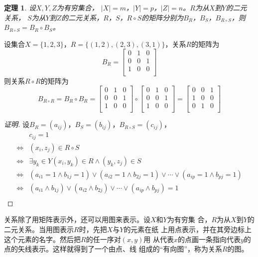 \documentclass{book}[oneside]
\newtheorem{Thm}{定理}[chapter]
\begin{document}
\begin{CJK*}{UTF8}{gbsn}
  \begin{Thm}
    设$X, Y, Z$为有穷集合， $|X| =m$，$|Y|=p$，$|Z| = n$。$R$为从$X$到$Y$的二元
    关系， $S$为从$Y$到$Z$的二元关系，$R$，$S$，$R \circ S$的矩阵分别为$B_{R}$，$B_{S}$，$B_{R\circ S}$，则$B_{R\circ S} = B_R \circ B_S$。
  \end{Thm}
  设集合$X=\{1,2,3\}$，$R=\{(1,2),(2,3),(3,1)\}$，关系$R$的矩阵为
  \[B_R=\begin{bmatrix}
    0&1&0\\
    0&0&1\\
    1&0&0\\
  \end{bmatrix}
\]
则关系$R\circ R$的矩阵为
\[B_{R\circ R}=B_R\circ B_R=\begin{bmatrix}
  0&1&0\\
  0&0&1\\
  1&0&0\\
\end{bmatrix}
\circ
\begin{bmatrix}
  0&1&0\\
  0&0&1\\
  1&0&0\\
\end{bmatrix}
=\begin{bmatrix}
  0&0&1\\
  1&0&0\\
  0&1&0\\
\end{bmatrix}
\]
\begin{proof}[证明]
  设$B_{R}=(a_{ij})$，$B_{S}=(b_{ij})$，$B_{R\circ S}=(c_{ij})$，
\begin{align*}
  &c_{ij}=1\\
  \Leftrightarrow&(x_i,z_j)\in R\circ S\\
  \Leftrightarrow&\exists y_k\in Y (x_i,y_k)\in R\land (y_k,z_j)\in S\\
\Leftrightarrow&(a_{i1}=1\land b_{1j}=1)\lor (a_{i2}=1\land b_{2j}=1)\lor \cdots \lor (a_{ip}=1\land b_{pj}=1)\\
  \Leftrightarrow&(a_{i1}\land b_{1j})\lor (a_{i2}\land b_{2j})\lor \cdots \lor (a_{ip}\land b_{pj}) = 1\\
\end{align*}
\end{proof}

关系除了用矩阵表示外，还可以用图来表示。设$X$和$Y$为有穷集
合，$R$为从$X$到$Y$的二元关系。当用图表示$R$时，先把$X$与$Y$的元素在纸
上用点表示，并在其旁边标上这个元素的名字。然后把$R$的任一序对$(x,y)$用
从代表$x$的点画一条指向代表$y$的点的矢线表示。这样就得到了一个由点、线
组成的“有向图”，称为关系$R$的图。



\end{CJK*}
\end{document}
